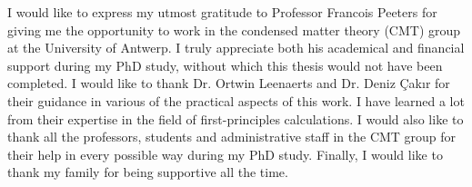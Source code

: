 
\begin{acknowledgements}      


I would like to express my utmost gratitude to Professor Francois Peeters for giving me the opportunity to work in the condensed matter theory (CMT) group at the University of Antwerp. I truly appreciate both his academical and financial support during my PhD study, without which this thesis would not have been completed. I would like to thank Dr. Ortwin Leenaerts and Dr. Deniz Çakır for their guidance in various of the practical aspects of this work. I have learned a lot from their expertise in the field of first-principles calculations. I would also like to thank all the professors, students and administrative staff in the CMT group for their help in every possible way during my PhD study. Finally, I would like to thank my family for being supportive all the time.

\end{acknowledgements}
